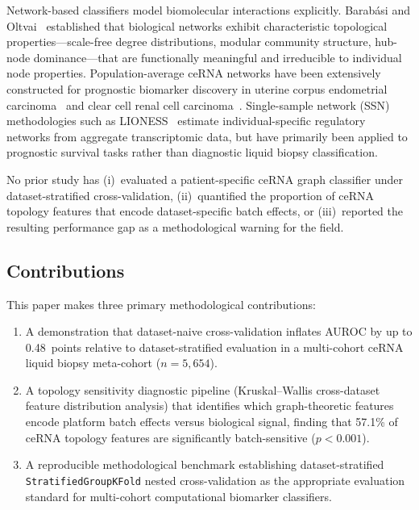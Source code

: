 \documentclass[12pt]{article}
\begin{document}
Network-based classifiers model biomolecular interactions explicitly.
Barab\'{a}si and Oltvai~\citep{barabasi2004} established that biological
networks exhibit characteristic topological properties---scale-free
degree distributions, modular community structure, hub-node
dominance---that are functionally meaningful and irreducible to
individual node properties. Population-average ceRNA networks have been
extensively constructed for prognostic biomarker discovery in uterine
corpus endometrial carcinoma~\citep{fan2025} and clear cell renal cell
carcinoma~\citep{farias2024}. Single-sample network (SSN) methodologies
such as LIONESS~\citep{kuijjer2019} estimate individual-specific
regulatory networks from aggregate transcriptomic data, but have
primarily been applied to prognostic survival tasks rather than
diagnostic liquid biopsy classification.

No prior study has (i)~evaluated a patient-specific ceRNA graph
classifier under dataset-stratified cross-validation, (ii)~quantified
the proportion of ceRNA topology features that encode dataset-specific
batch effects, or (iii)~reported the resulting performance gap as a
methodological warning for the field.

\subsection{Contributions}

This paper makes three primary methodological contributions:

\begin{enumerate}
  \item A demonstration that dataset-naive cross-validation inflates
  AUROC by up to 0.48~points relative to dataset-stratified evaluation
  in a multi-cohort ceRNA liquid biopsy meta-cohort ($n=5{,}654$).

  \item A topology sensitivity diagnostic pipeline
  (Kruskal--Wallis cross-dataset feature distribution analysis) that
  identifies which graph-theoretic features encode platform batch
  effects versus biological signal, finding that 57.1\% of ceRNA
  topology features are significantly batch-sensitive ($p < 0.001$).

  \item A reproducible methodological benchmark establishing
  dataset-stratified \texttt{StratifiedGroupKFold} nested
  cross-validation as the appropriate evaluation standard for
  multi-cohort computational biomarker classifiers.
\end{enumerate}
\end{document}
